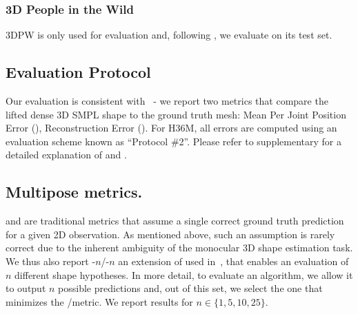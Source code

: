 \subsubsection{3D People in the Wild}
3DPW is only used for evaluation and, following \cite{kolotouros19convolutional}, we evaluate on its test set.

\subsection{Evaluation Protocol}

Our evaluation is consistent with~\cite{kolotouros19learning,kolotouros19convolutional} - we report two metrics that compare the lifted dense 3D SMPL shape to the ground truth mesh: Mean Per Joint Position Error (\textbf{\MPJPE}), Reconstruction Error (\textbf{\RE}). 
For H36M, all errors are computed using an evaluation scheme known as ``Protocol \#2''. Please refer to supplementary for a detailed explanation of \MPJPE and \RE.



\subsection{Multipose metrics.}

\MPJPE and \RE are traditional metrics that assume a single correct ground truth prediction for a given 2D observation.
As mentioned above, such an assumption is rarely correct due to the inherent ambiguity of the monocular 3D shape estimation task.
We thus also report \MPJPE-$n$/\RE-$n$ an extension of \MPJPE\RE used in~\cite{li19generating}, that enables an evaluation of $n$ different shape hypotheses.
In more detail, to evaluate an algorithm, we allow it to output $n$ possible predictions and, out of this set, we select the one that minimizes the \MPJPE/\RE metric.
We report results for $n\in \{1,5,10,25\}$.

